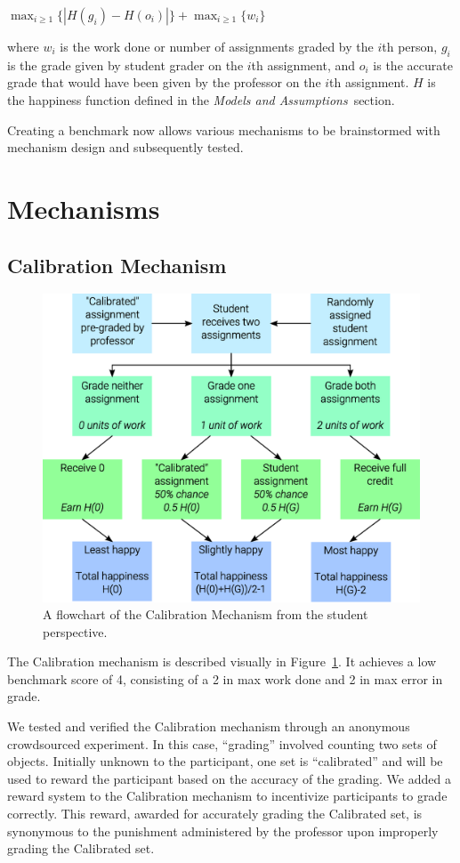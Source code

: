 \documentclass{sigchi}
\begin{document}
$\max_{i \ge 1} \{|H(g_i)-H(o_i)|\} + \max_{i \ge 1} \{w_i\}$

where $w_i$ is the work done or number of assignments graded by the $i$th person, $g_i$ is the grade given by student grader on the $i$th assignment, and $o_i$ is the accurate grade that would have been given by the professor on the $i$th assignment. $H$ is the happiness function defined in the \textit{Models and Assumptions}~section.

Creating a benchmark now allows various mechanisms to be brainstormed with mechanism design and subsequently tested.
\section{Mechanisms}
\subsection{Calibration Mechanism}

\begin{figure}[!h]
\centering
\includegraphics[width=0.9\columnwidth]{Calibration-Flowchart.eps}
\caption{A flowchart of the Calibration Mechanism from the student perspective.}
\label{fig:calibration}
\end{figure}

The Calibration mechanism is described visually in Figure~\ref{fig:calibration}. It achieves a low benchmark score of 4, consisting of a 2 in max work done and 2 in max error in grade.

We tested and verified the Calibration mechanism through an anonymous crowdsourced experiment. In this case, ``grading'' involved counting two sets of objects. Initially unknown to the participant, one set is ``calibrated'' and will be used to reward the participant based on the accuracy of the grading. We added a reward system to the Calibration mechanism to incentivize participants to grade correctly. This reward, awarded for accurately grading the Calibrated set, is synonymous to the punishment administered by the professor upon improperly grading the Calibrated set.
\end{document}
